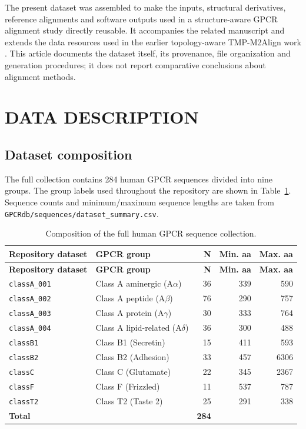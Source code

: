 \documentclass[a4paper,12pt]{article}
\begin{document}
	The present dataset was assembled to make the inputs, structural derivatives, reference alignments and software outputs used in a structure-aware GPCR alignment study directly reusable. It accompanies the related manuscript \cite{cedeno2026structalign} and extends the data resources used in the earlier topology-aware TMP-M2Align work \cite{cedeno2025tmpm2align}. This article documents the dataset itself, its provenance, file organization and generation procedures; it does not report comparative conclusions about alignment methods.
	
	\section*{DATA DESCRIPTION}
	
	\subsection*{Dataset composition}
	The full collection contains 284 human GPCR sequences divided into nine groups. The group labels used throughout the repository are shown in Table~\ref{tab:composition}. Sequence counts and minimum/maximum sequence lengths are taken from \texttt{GPCRdb/sequences/dataset\_summary.csv}.
	
	\begin{longtable}{p{3.0cm}p{5.1cm}rrr}
		\caption{Composition of the full human GPCR sequence collection.}\label{tab:composition}\\
		\toprule
		\textbf{Repository dataset} & \textbf{GPCR group} & \textbf{N} & \textbf{Min. aa} & \textbf{Max. aa}\\
		\midrule
		\endfirsthead
		\toprule
		\textbf{Repository dataset} & \textbf{GPCR group} & \textbf{N} & \textbf{Min. aa} & \textbf{Max. aa}\\
		\midrule
		\endhead
		\texttt{classA\_001} & Class A aminergic (A$\alpha$) & 36 & 339 & 590\\
		\texttt{classA\_002} & Class A peptide (A$\beta$) & 76 & 290 & 757\\
		\texttt{classA\_003} & Class A protein (A$\gamma$) & 30 & 333 & 764\\
		\texttt{classA\_004} & Class A lipid-related (A$\delta$) & 36 & 300 & 488\\
		\texttt{classB1} & Class B1 (Secretin) & 15 & 411 & 593\\
		\texttt{classB2} & Class B2 (Adhesion) & 33 & 457 & 6306\\
		\texttt{classC} & Class C (Glutamate) & 22 & 345 & 2367\\
		\texttt{classF} & Class F (Frizzled) & 11 & 537 & 787\\
		\texttt{classT2} & Class T2 (Taste 2) & 25 & 291 & 338\\
		\midrule
		\textbf{Total} & & \textbf{284} & &\\
		\bottomrule
	\end{longtable}
	
\end{document}
